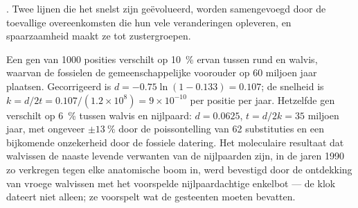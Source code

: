 \begin{omfigure}

{\small {}. Twee lijnen die het snelst zijn
geëvolueerd, worden samengevoegd door de toevallige overeenkomsten die hun vele
veranderingen opleveren, en spaarzaamheid maakt ze tot zustergroepen.}
\end{omfigure}

\begin{example}\label{ex:b2:phylogenetic-trees:dating}
Een gen van \num{1000} posities verschilt op \qty{10}{\%} ervan tussen
rund en walvis, waarvan de fossielen de gemeenschappelijke voorouder op 60
miljoen jaar plaatsen. Gecorrigeerd is $d = -0.75\ln(1 - 0.133) = 0.107$; de
snelheid is $k
= d/2t = 0.107/(1.2\times 10^{8}) = 9\times 10^{-10}$ per positie per
jaar. Hetzelfde gen verschilt op \qty{6}{\%} tussen walvis en nijlpaard:
$d = 0.0625$, $t = d/2k = 35$ miljoen jaar, met ongeveer $\pm
\qty{13}{\%}$ door de poissontelling van 62 substituties en een
bijkomende onzekerheid door de fossiele datering. Het moleculaire resultaat
dat walvissen de naaste levende verwanten van de nijlpaarden zijn, in de jaren
1990 zo verkregen tegen elke anatomische boom in, werd bevestigd door de
ontdekking van vroege walvissen met het voorspelde nijlpaardachtige
enkelbot --- de klok dateert niet alleen; ze voorspelt wat de gesteenten
moeten bevatten.
\end{example}

